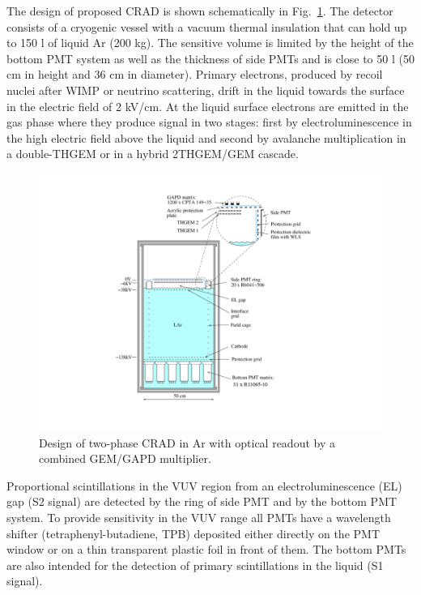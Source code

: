 \documentclass[a4paper,11pt]{article}
\begin{document}
The design of proposed CRAD is shown schematically in Fig.~\ref{fig:CRAD}. The detector consists of a cryogenic vessel with a vacuum 
thermal insulation that can hold up to 150 l of liquid Ar (200 kg). The sensitive volume is limited by the height 
of the bottom PMT system as well as the thickness of side PMTs and is close to 50 l (50 cm in height and 36 cm in diameter). 
Primary electrons, produced by recoil nuclei after WIMP or neutrino scattering, drift in the liquid towards the surface 
in the electric field of 2 kV/cm. At the liquid surface electrons are emitted in the gas phase where they produce signal 
in two stages: first by electroluminescence in the high electric field above the liquid and second by avalanche multiplication 
in a double-THGEM or in a hybrid 2THGEM/GEM cascade.
\begin{figure}[htbp]
\centering
\includegraphics[width=1.0\textwidth,viewport=1 1 700 500,clip]{figures/CRAD.png}
\caption{Design of two-phase CRAD in Ar with optical readout by a combined GEM/GAPD multiplier.}
\label{fig:CRAD}
\end{figure}

Proportional scintillations in the VUV region from an electroluminescence (EL) gap (S2 signal) are detected by the ring of side PMT 
and by the bottom PMT system. To provide sensitivity in the VUV range all PMTs have a wavelength shifter (tetraphenyl-butadiene, TPB) 
deposited either directly on the PMT window or on a thin transparent plastic foil in front of them. The bottom PMTs are also intended 
for the detection of primary scintillations in the liquid (S1 signal).
\end{document}
